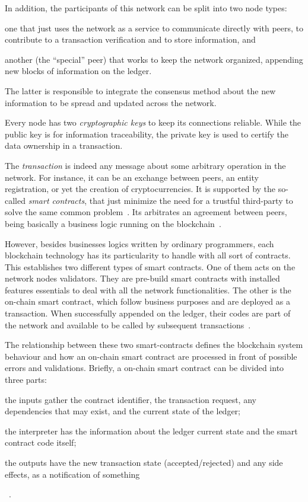 In addition, the participants of this network can be split into two node types:
\begin{enumerate*}[label={(\roman*)}]
    \item one that just uses the network as a service to communicate directly with peers, to contribute to a transaction verification and to store information, and
    \item another (the ``special'' peer) that works to keep the network organized, appending new blocks of information on the ledger.
\end{enumerate*}
The latter is responsible to integrate the consensus method about the new information to be spread and updated across the network.

Every node has two \emph{cryptographic keys} to keep its connections reliable.
While the public key is for information traceability, the private key is used to certify the data ownership in a transaction.

The \emph{transaction} is indeed any message about some arbitrary operation in the network.
For instance, it can be an exchange between peers, an entity registration, or yet the creation of cryptocurrencies.
It is supported by the so-called \emph{smart contracts}, that just minimize the need for a trustful third-party to solve the same common problem~\cite{swan2015blockchain}.
Its arbitrates an agreement between peers, being basically a business logic running on the blockchain~\cite{hyper2}.

However, besides businesses logics written by ordinary programmers, each blockchain technology has its particularity to handle with all sort of contracts.
This establishes two different types of smart contracts.
One of them acts on the network nodes validators. They are pre-build smart contracts with installed features essentials to deal with all the network functionalities.
The other is the on-chain smart contract, which follow business purposes and are deployed as a transaction. When successfully appended on the ledger, their codes are part of the network and available to be called by subsequent transactions~\cite{hyper2}.

The relationship between these two smart-contracts defines the blockchain system behaviour and how an on-chain smart contract are processed in front of possible errors and validations.
Briefly, a on-chain smart contract can be divided into three parts:
\begin{enumerate*}[label={(\roman*)}]
    \item the inputs gather the contract identifier, the transaction request, any dependencies that may exist, and the current state of the ledger;
    \item the interpreter has the information about the ledger current state and the smart contract code itself;
    \item the outputs have the new transaction state (accepted/rejected) and any side effects, as a notification of something
\end{enumerate*}
~\cite{hyper2}.

